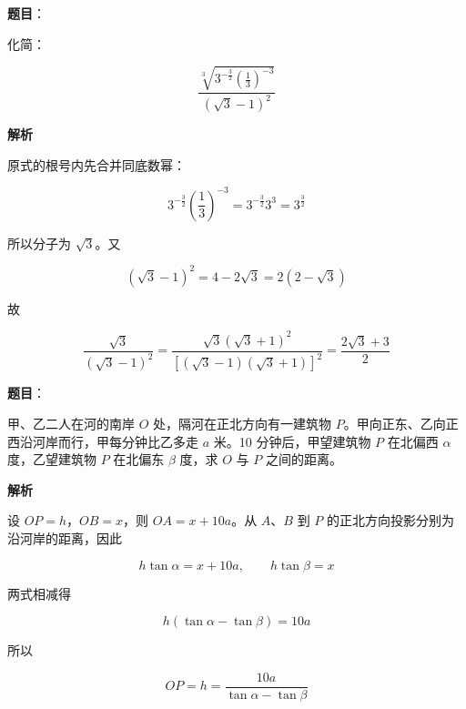 

\begin{answer}

\textbf{题目}：

化简：

\nopagebreak[4]
\[\frac{\sqrt[3]{3^{-\frac32}\left(\frac13\right)^{-3}}}{(\sqrt3-1)^2}\]

\textbf{解析}

原式的根号内先合并同底数幂：

\nopagebreak[4]
\[3^{-\frac32}\left(\frac13\right)^{-3}=3^{-\frac32}3^3=3^{\frac32}\]

所以分子为 $\sqrt3$。又

\nopagebreak[4]
\[\left(\sqrt3-1\right)^2=4-2\sqrt3=2(2-\sqrt3)\]

故

\nopagebreak[4]
\[\frac{\sqrt3}{(\sqrt3-1)^2}=\frac{\sqrt3(\sqrt3+1)^2}{\left[(\sqrt3-1)(\sqrt3+1)\right]^2}=\frac{2\sqrt3+3}{2}\]


\end{answer}
\begin{answer}

\textbf{题目}：

甲、乙二人在河的南岸 $O$ 处，隔河在正北方向有一建筑物 $P$。甲向正东、乙向正西沿河岸而行，甲每分钟比乙多走 $a$ 米。10 分钟后，甲望建筑物 $P$ 在北偏西 $\alpha$ 度，乙望建筑物 $P$ 在北偏东 $\beta$ 度，求 $O$ 与 $P$ 之间的距离。

\textbf{解析}

设 $OP=h$，$OB=x$，则 $OA=x+10a$。从 $A$、$B$ 到 $P$ 的正北方向投影分别为沿河岸的距离，因此

\nopagebreak[4]
\[h\tan\alpha=x+10a,\qquad h\tan\beta=x\]

两式相减得

\nopagebreak[4]
\[h(\tan\alpha-\tan\beta)=10a\]

所以

\nopagebreak[4]
\[OP=h=\frac{10a}{\tan\alpha-\tan\beta}\]
\nopagebreak[4]
\begin{center}\end{center}
\nopagebreak[4]

\end{answer}
